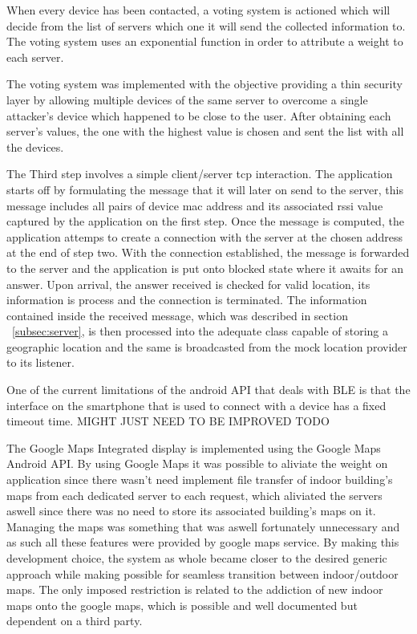 \documentclass[a4paper]{IEEEtran}
\begin{document}
When every device has been contacted, a voting system is actioned which will decide from the list of servers which one it will send the collected information to. The voting system uses an exponential function in order to attribute a weight to each server. %

The voting system was implemented with the objective providing a thin security layer by allowing multiple devices of the same server to overcome a single attacker's device which happened to be close to the user. After obtaining each server's values, the one with the highest value is chosen and sent the list with all the devices. 

The Third step involves a simple client/server tcp interaction. The application starts off by formulating the message that it will later on send to the server, this message includes all pairs of device mac address and its associated rssi value captured by the application on the first step. Once the message is computed, the application attemps to create a connection with the server at the chosen address at the end of step two. With the connection established, the message is forwarded to the server and the application is put onto blocked state where it awaits for an answer. Upon arrival, the answer received is checked for valid location, its information is process and the connection is terminated. The information contained inside the received message, which was described in section ~\ref{subsec:server}, is then processed into the adequate class capable of storing a geographic location and the same is broadcasted from the mock location provider to its listener. 



One of the current limitations of the android API that deals with BLE is that the interface on the smartphone that is used to connect with a device has a fixed timeout time.  MIGHT JUST NEED TO BE IMPROVED TODO


The Google Maps Integrated display is implemented using the Google Maps Android API. By using Google Maps it was possible to aliviate the weight on application since there wasn't need implement file transfer of indoor building's maps from each dedicated server to each request, which aliviated the servers aswell since there was no need to store its associated building's maps on it. Managing the maps was something that was aswell fortunately unnecessary and as such all these features were provided by google maps service. By making this development choice, the system as whole became closer to the desired generic approach while making possible for seamless transition between indoor/outdoor maps. The only imposed restriction is related to the addiction of new indoor maps onto the google maps, which is possible and well documented but dependent on a third party.
\end{document}
